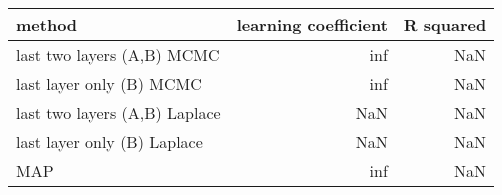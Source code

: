 \begin{tabular}{lrr}
\toprule
                        method &  learning coefficient &  R squared \\
\midrule
    last two layers (A,B) MCMC &                   inf &        NaN \\
      last layer only (B) MCMC &                   inf &        NaN \\
 last two layers (A,B) Laplace &                   NaN &        NaN \\
   last layer only (B) Laplace &                   NaN &        NaN \\
                           MAP &                   inf &        NaN \\
\bottomrule
\end{tabular}
